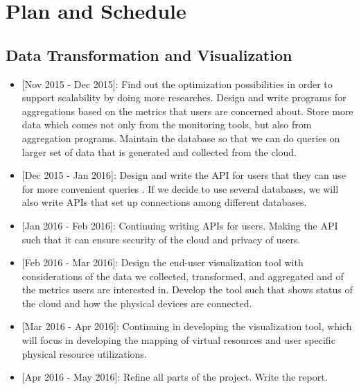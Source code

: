 \section{Plan and Schedule}
\label{sec:Plan}



\subsection{Data Transformation and Visualization}
\begin{itemize}
\item{[Nov 2015 - Dec 2015]:} Find out the optimization possibilities in order to support scalability by doing more researches. Design and write programs for aggregations based on the metrics that users are concerned about. Store more data which comes not only from the monitoring tools, but also from aggregation programs. Maintain the database so that we can do queries on larger set of data that is generated and collected from the cloud.  
\item{[Dec 2015 - Jan 2016]:} Design and write the API for users that they can use for more convenient queries . If we decide to use several databases, we will also write APIs that set up connections among different databases. 
\item{[Jan 2016 - Feb 2016]:} Continuing writing APIs for users. Making the API such that it can ensure security of the cloud and privacy of users. 
\item{[Feb 2016 - Mar 2016]:} Design the end-user visualization tool with considerations of the data we collected, transformed, and aggregated and of the metrics users are interested in. Develop the tool such that shows status of the cloud and how the physical devices are connected.  
\item{[Mar 2016 - Apr 2016]:} Continuing in developing the visualization tool, which will focus in developing the mapping of virtual resources and user specific physical resource utilizations. 
\item{[Apr 2016 - May 2016]:} Refine all parts of the project. Write the report.
\end{itemize}
